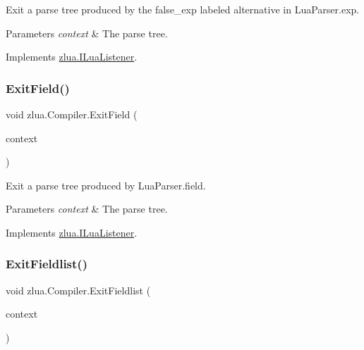 Exit a parse tree produced by the {\ttfamily false\+\_\+exp} labeled alternative in Lua\+Parser.\+exp. 


\begin{DoxyParams}{Parameters}
{\em context} & The parse tree.\\
\hline
\end{DoxyParams}


Implements \mbox{\hyperlink{interfacezlua_1_1_i_lua_listener_a78a5b4e244b54f1233447bc8da8f1ac2}{zlua.\+I\+Lua\+Listener}}.

\mbox{\label{classzlua_1_1_compiler_a169d31b8bd893ddc06b90184f76ecdc7}} 
\subsubsection{\texorpdfstring{Exit\+Field()}{ExitField()}}
{\footnotesize\ttfamily void zlua.\+Compiler.\+Exit\+Field (\begin{DoxyParamCaption}\item[{\mbox{[}\+Not\+Null\mbox{]} \mbox{\hyperlink{classzlua_1_1_lua_parser_1_1_field_context}{Lua\+Parser.\+Field\+Context}}}]{context }\end{DoxyParamCaption})}



Exit a parse tree produced by Lua\+Parser.\+field. 


\begin{DoxyParams}{Parameters}
{\em context} & The parse tree.\\
\hline
\end{DoxyParams}


Implements \mbox{\hyperlink{interfacezlua_1_1_i_lua_listener_aa5a80474f82e45908ec603e36a505f84}{zlua.\+I\+Lua\+Listener}}.

\mbox{\label{classzlua_1_1_compiler_abff740fa28ffb3a5dfd363aff46825b1}} 
\subsubsection{\texorpdfstring{Exit\+Fieldlist()}{ExitFieldlist()}}
{\footnotesize\ttfamily void zlua.\+Compiler.\+Exit\+Fieldlist (\begin{DoxyParamCaption}\item[{\mbox{[}\+Not\+Null\mbox{]} \mbox{\hyperlink{classzlua_1_1_lua_parser_1_1_fieldlist_context}{Lua\+Parser.\+Fieldlist\+Context}}}]{context }\end{DoxyParamCaption})}



